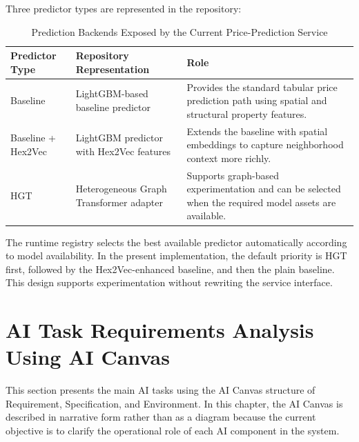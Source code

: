 Three predictor types are represented in the repository:

\begin{table}[htbp]
    \centering
    \small
    \renewcommand{\arraystretch}{1.25}
    \begin{tabularx}{\textwidth}{>{\raggedright\arraybackslash}p{}>{\raggedright\arraybackslash}p{}>{\raggedright\arraybackslash}X}
        \toprule
        \rowcolor[gray]{0.9} \textbf{Predictor Type} & \textbf{Repository Representation} & \textbf{Role} \\
        \midrule
        Baseline & LightGBM-based baseline predictor & Provides the standard tabular price prediction path using spatial and structural property features. \\
        Baseline + Hex2Vec & LightGBM predictor with Hex2Vec features & Extends the baseline with spatial embeddings to capture neighborhood context more richly. \\
        HGT & Heterogeneous Graph Transformer adapter & Supports graph-based experimentation and can be selected when the required model assets are available. \\
        \bottomrule
    \end{tabularx}
    \caption{Prediction Backends Exposed by the Current Price-Prediction Service}
    \label{tab:chapter5-predictor-types}
\end{table}

The runtime registry selects the best available predictor automatically according to model availability. In the present implementation, the default priority is HGT first, followed by the Hex2Vec-enhanced baseline, and then the plain baseline. This design supports experimentation without rewriting the service interface.

\section{AI Task Requirements Analysis Using AI Canvas}

This section presents the main AI tasks using the AI Canvas structure of Requirement, Specification, and Environment. In this chapter, the AI Canvas is described in narrative form rather than as a diagram because the current objective is to clarify the operational role of each AI component in the system.

